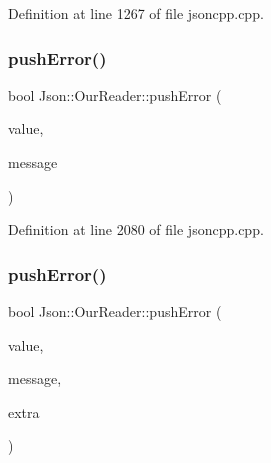 Definition at line 1267 of file jsoncpp.\+cpp.

\hypertarget{class_json_1_1_our_reader_a700e9d8e0977fa7e0375d26690d7025f}{}\label{class_json_1_1_our_reader_a700e9d8e0977fa7e0375d26690d7025f} 
\subsubsection{\texorpdfstring{push\+Error()}{pushError()}\hspace{0.1cm}{\footnotesize\ttfamily [1/2]}}
{\footnotesize\ttfamily bool Json\+::\+Our\+Reader\+::push\+Error (\begin{DoxyParamCaption}\item[{const \hyperlink{class_json_1_1_value}{Value} \&}]{value,  }\item[{const \hyperlink{config_8h_a1e723f95759de062585bc4a8fd3fa4be}{J\+S\+O\+N\+C\+P\+P\+\_\+\+S\+T\+R\+I\+NG} \&}]{message }\end{DoxyParamCaption})}



Definition at line 2080 of file jsoncpp.\+cpp.

\hypertarget{class_json_1_1_our_reader_addccecfca74b79adaad6115ddd614477}{}\label{class_json_1_1_our_reader_addccecfca74b79adaad6115ddd614477} 
\subsubsection{\texorpdfstring{push\+Error()}{pushError()}\hspace{0.1cm}{\footnotesize\ttfamily [2/2]}}
{\footnotesize\ttfamily bool Json\+::\+Our\+Reader\+::push\+Error (\begin{DoxyParamCaption}\item[{const \hyperlink{class_json_1_1_value}{Value} \&}]{value,  }\item[{const \hyperlink{config_8h_a1e723f95759de062585bc4a8fd3fa4be}{J\+S\+O\+N\+C\+P\+P\+\_\+\+S\+T\+R\+I\+NG} \&}]{message,  }\item[{const \hyperlink{class_json_1_1_value}{Value} \&}]{extra }\end{DoxyParamCaption})}



